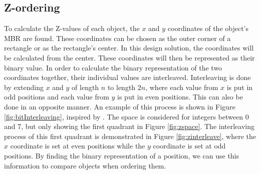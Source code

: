 \subsection{Z-ordering}
\label{sect:zordering}
To calculate the Z-values of each object, the $x$ and $y$ coordinates of the object's MBR are found. These coordinates can be chosen as the outer corner of a rectangle or as the rectangle's center. In this design solution, the coordinates will be calculated from the center. These coordinates will then be represented as their binary value. In order to calculate the binary representation of the two coordinates together, their individual values are interleaved. Interleaving is done by extending $x$ and $y$ of length $n$ to length $2n$, where each value from $x$ is put in odd positions and each value from $y$ is put in even positions\cite{interleave}. This can also be done in an opposite manner. An example of this process is shown in Figure \ref{fig:bitInterleaving}, inspired by \cite{zorder_figure}. The space is considered for integers between 0 and 7, but only showing the first quadrant in Figure \ref{fig:zspace}. The interleaving process of this first quadrant is demonstrated in Figure \ref{fig:zinterleave}, where the $x$ coordinate is set at even positions while the $y$ coordinate is set at odd positions. By finding the binary representation of a position, we can use this information to compare objects when ordering them. 

